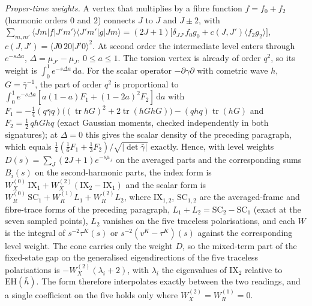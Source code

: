\emph{Proper-time weights.} A vertex that multiplies by a fibre function \(f=f_0+f_2\) (harmonic orders \(0\) and \(2\)) connects \(J\) to \(J\) and \(J\pm2\), with \(\sum_{m,m'}\langle Jm|f|J'm'\rangle\langle J'm'|g|Jm\rangle=(2J+1)\bigl[\delta_{JJ'}f_0g_0+c(J,J')\langle f_2g_2\rangle\bigr]\), \(c(J,J')=\langle J0\,20|J'0\rangle^2\). At second order the intermediate level enters through \(e^{-s\Delta a}\), \(\Delta=\mu_{J'}-\mu_J\), \(0\le a\le1\). The torsion vertex is already of order \(q^2\), so its weight is \(\int_0^1e^{-s\Delta a}\,\mathrm da\). For the scalar operator \(-\partial\gamma\partial\) with cometric wave \(h\), \(G=\bar\gamma^{-1}\), the part of order \(q^2\) is proportional to \(\int_0^1e^{-s\Delta a}[a(1-a)F_1+(1-2a)^2F_2]\,\mathrm da\) with \(F_1=-\tfrac14(q\bar\gamma q)\bigl((\operatorname{tr}hG)^2+2\operatorname{tr}(hGhG)\bigr)-(qhq)\operatorname{tr}(hG)\) and \(F_2=\tfrac12\,qhGhq\) (exact Gaussian moments, checked independently in both signatures); at \(\Delta=0\) this gives the scalar density of the preceding paragraph, which equals \(\tfrac14(\tfrac16F_1+\tfrac13F_2)/\sqrt{\lvert\det\bar\gamma\rvert}\) exactly. Hence, with level weights \(D(s)=\sum_J(2J+1)e^{-s\mu_J}\) on the averaged parts and the corresponding sums \(B_i(s)\) on the second-harmonic parts, the index form is \(W_X^{(0)}\,\mathrm{IX}_1+W_X^{(2)}(\mathrm{IX}_2-\mathrm{IX}_1)\) and the scalar form is \(W_R^{(0)}\,\mathrm{SC}_1+W_R^{(1)}L_1+W_R^{(2)}L_2\), where \(\mathrm{IX}_{1,2}\), \(\mathrm{SC}_{1,2}\) are the averaged-frame and fibre-trace forms of the preceding paragraph, \(L_1+L_2=\mathrm{SC}_2-\mathrm{SC}_1\) (exact at the seven sampled points), \(L_2\) vanishes on the five traceless polarisations, and each \(W\) is the integral of \(s^{-2}\tau^K(s)\) or \(s^{-2}(v^K-\tau^K)(s)\) against the corresponding level weight. The cone carries only the weight \(D\), so the mixed-term part of the fixed-state gap on the generalised eigendirections of the five traceless polarisations is \(-W_X^{(2)}(\lambda_i+2)\), with \(\lambda_i\) the eigenvalues of \(\mathrm{IX}_2\) relative to \(\mathrm{EH}(\bar h)\). The form therefore interpolates exactly between the two readings, and a single coefficient on the five holds only where \(W_X^{(2)}=W_R^{(1)}=0\).

